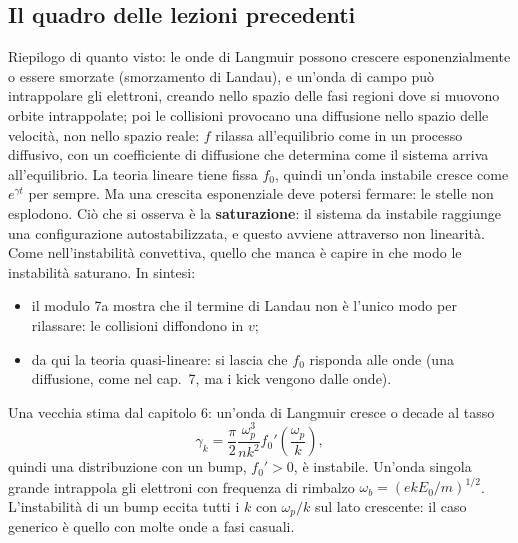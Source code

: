 \subsection{Il quadro delle lezioni precedenti}
Riepilogo di quanto visto: le onde di Langmuir possono crescere esponenzialmente o essere smorzate (smorzamento di Landau), e un'onda di campo può intrappolare gli elettroni, creando nello spazio delle fasi regioni dove si muovono orbite intrappolate; poi le collisioni provocano una diffusione nello spazio delle velocità, non nello spazio reale: $f$ rilassa all'equilibrio come in un processo diffusivo, con un coefficiente di diffusione che determina come il sistema arriva all'equilibrio.
La teoria lineare tiene fissa $f_0$, quindi un'onda instabile cresce come $e^{\gamma t}$ per sempre. Ma una crescita esponenziale deve potersi fermare: le stelle non esplodono. Ciò che si osserva è la \textbf{saturazione}: il sistema da instabile raggiunge una configurazione autostabilizzata, e questo avviene attraverso non linearità. Come nell'instabilità convettiva, quello che manca è capire in che modo le instabilità saturano. In sintesi:
\begin{itemize}
\item il modulo 7a mostra che il termine di Landau non è l'unico modo per rilassare: le collisioni diffondono in $v$;
\item da qui la teoria quasi-lineare: si lascia che $f_0$ risponda alle onde (una diffusione, come nel cap.~7, ma i kick vengono dalle onde).
\end{itemize}
Una vecchia stima dal capitolo 6: un'onda di Langmuir cresce o decade al tasso
\begin{equation}
\gamma_k=\frac{\pi}{2}\frac{\omega_p^3}{nk^2}f_0'\left(\frac{\omega_p}{k}\right),
\end{equation}
quindi una distribuzione con un bump, $f_0'>0$, è instabile. Un'onda singola grande intrappola gli elettroni con frequenza di rimbalzo $\omega_b=(ekE_0/m)^{1/2}$. L'instabilità di un bump eccita tutti i $k$ con $\omega_p/k$ sul lato crescente: il caso generico è quello con molte onde a fasi casuali.

